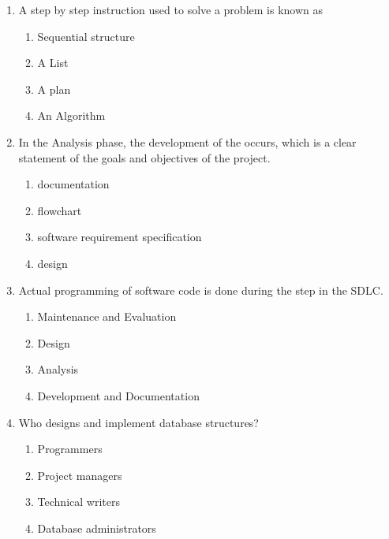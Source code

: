 \documentclass[12pt]{article}
\newcommand{\perhapsanswer}{%
  \ifanswer
    $\blacksquare$ \global\answerfalse
  \else
    $\square$ \global\answerfalse
  \fi
}
\newif\ifanswer
\begin{document}
\begin{enumerate}
    \item A step by step instruction used to solve a problem is known as
    \begin{enumerate}[start=1,align=left,label={\protect\perhapsanswer(\alph*)}]
      \item Sequential structure
      \item A List
      \item A plan
      \item An Algorithm
    \end{enumerate}

    \item In the Analysis phase, the development of the \underline{\phantom{Neither of the above}} occurs, which is a clear statement of the goals and objectives of the project.
    \begin{enumerate}[start=1,align=left,label={\protect\perhapsanswer(\alph*)}]
      \item documentation
      \item flowchart
      \item software requirement specification
      \item design
    \end{enumerate}

    \item Actual programming of software code is done during the \underline{\phantom{Neither of the above}} step in the SDLC.
    \begin{enumerate}[start=1,align=left,label={\protect\perhapsanswer(\alph*)}]
      \item Maintenance and Evaluation
      \item Design
      \item Analysis
      \item Development and Documentation
    \end{enumerate}

    \item Who designs and implement database structures?
    \begin{enumerate}[start=1,align=left,label={\protect\perhapsanswer(\alph*)}]
      \item Programmers
      \item Project managers
      \item Technical writers
      \item Database administrators
    \end{enumerate}


\end{enumerate}
\end{document}
